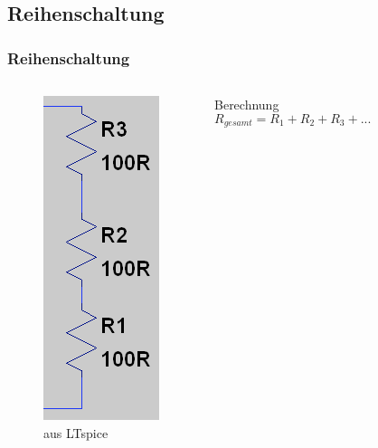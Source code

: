 \subsection{Reihenschaltung}
\begin{frame}
  \frametitle{Reihenschaltung}

  \begin{columns}
    \begin{center}
      \begin{figure}
        \includegraphics[width=.4\textwidth,height=.5\textheight,keepaspectratio]{e04/Reihe.png}
        \caption{aus LTspice}
      \end{figure}
    \end{center}
    \pause
    \begin{block}{Berechnung}
      $$R_{gesamt} = R_1 + R_2 + R_3 + ...$$
    \end{block}
  \end{columns}

\end{frame}

